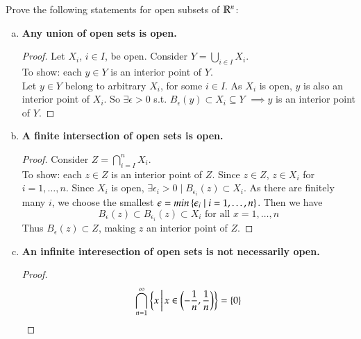  Prove the following statements for open subsets of $\mathbb{R}^n$:
\begin{enumerate}[a.]
  \item \textbf{Any union of open sets is open.} \\
  \begin{proof}
    Let $X_i$, $i \in I$, be open. Consider $Y = \bigcup_{i\in I}X_i$. \\
    To show: each $y \in Y$ is an interior point of $Y$. \\
    Let $y\in Y$ belong to arbitrary $X_i$, for some $i\in I$. As $X_i$ is open, $y$ is also an interior point of $X_i$. So $\exists \epsilon > 0$ s.t. $B_\epsilon (y) \subset X_i \subseteq Y$ $\implies y$ is an interior point of $Y$.
  \end{proof}
  \item \textbf{A finite intersection of open sets is open.} \\
  \begin{proof}
    Consider $Z = \bigcap^n_{i=I}X_i$. \\
    To show: each $z\in Z$ is an interior point of $Z$. Since $z\in Z$, $z\in X_i$ for $i=1,\dots,n$. Since $X_i$ is open, $\exists\epsilon_i > 0 \mid B_{\epsilon_i}(z) \subset X_i$. As there are finitely many $i$, we choose the smallest $\epsilon=min\left\{ \epsilon_i \mid i = 1,\dots,n \right\}$. Then we have
    \[B_\epsilon (z) \subset B_{\epsilon_i}(z) \subset X_i \text{ for all } x=1,\dots,n\]
    Thus $B_\epsilon (z)\subset Z$, making $z$ an interior point of $Z$.
  \end{proof}

  \item\textbf{An infinite interesection of open sets is not necessarily open.}
  
  \begin{proof}
    \[\bigcap_{n=1}^{\infty} \left\{ x \,\middle\vert\, x\in \left(-\frac{1}{n}, \frac{1}{n}\right) \right\}=\left\{ 0 \right\}\]
  \end{proof}
\end{enumerate}
